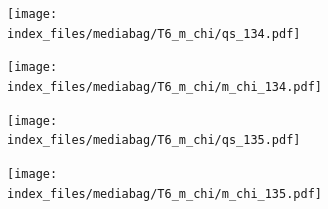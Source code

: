 \documentclass[
  11pt,
  letterpaper,
]{scrreprt}
\begin{document}
\begin{figure}

\begin{minipage}{0.50\linewidth}

\begin{figure}[H]

{\centering \texttt{[image: index\_files/mediabag/T6\_m\_chi/qs\_134.pdf]}

}


\end{figure}%

\end{minipage}%
%
\begin{minipage}{0.50\linewidth}

\begin{figure}[H]

{\centering \texttt{[image: index\_files/mediabag/T6\_m\_chi/m\_chi\_134.pdf]}

}


\end{figure}%

\end{minipage}%

\end{figure}%

\begin{figure}

\begin{minipage}{0.50\linewidth}

\begin{figure}[H]

{\centering \texttt{[image: index\_files/mediabag/T6\_m\_chi/qs\_135.pdf]}

}


\end{figure}%

\end{minipage}%
%
\begin{minipage}{0.50\linewidth}

\begin{figure}[H]

{\centering \texttt{[image: index\_files/mediabag/T6\_m\_chi/m\_chi\_135.pdf]}

}


\end{figure}%

\end{minipage}%

\end{figure}%
\end{document}
